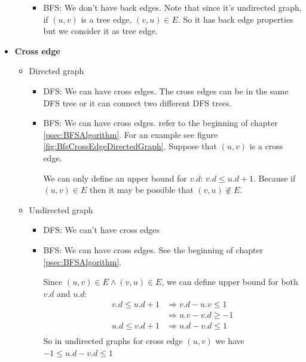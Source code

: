 \documentclass{book}
\begin{document}
\begin{itemize}
\begin{itemize}
\begin{itemize}
				\item BFS: We don't have back edges. Note that since it's undirected graph, if $(u, v)$ is a tree edge, $(v, u) \in E$. So it has back edge properties but we consider it as tree edge.
			\end{itemize}
		\end{itemize}
		\item \textbf{Cross edge}
		\begin{itemize}
			\item Directed graph
			\begin{itemize}
				\item DFS: We can have cross edges. The cross edges can be in the same DFS tree or it can connect two different DFS trees.
				\item BFS: We can have cross edges. refer to the beginning of chapter \ref{psec:BFSAlgorithm}. For an example see figure \ref{fig:BfsCrossEdgeDirectedGraph}. Suppose that $(u, v)$ is a cross edge. 
				\par We can only define an upper bound for $v.d$: $v.d \le u.d + 1$. Because if $(u, v) \in E$ then it may be possible that $(v, u) \notin E$.
			\end{itemize}
			\item Undirected graph
			\begin{itemize}
				\item DFS: We can't have cross edges
				\item BFS: We can have cross edges. See the beginning of chapter \ref{psec:BFSAlgorithm}.
				\par Since $(u, v) \in E \land (v, u) \in E$, we can define upper bound for both $v.d$ and $u.d$:
				\begin{equation*}
				\begin{split}
					v.d \le u.d + 1 &\Rightarrow v.d - u.v \le 1 \\
					&\Rightarrow u.v - v.d \ge -1 \\
					u.d \le v.d + 1 &\Rightarrow u.d - v.d \le 1 \\
				\end{split}
				\end{equation*}
				So in undirected graphs for cross edge $(u, v)$ we have $-1 \le u.d - v.d \le 1$
			\end{itemize}
		\end{itemize}		
	\end{itemize}
\end{document}

